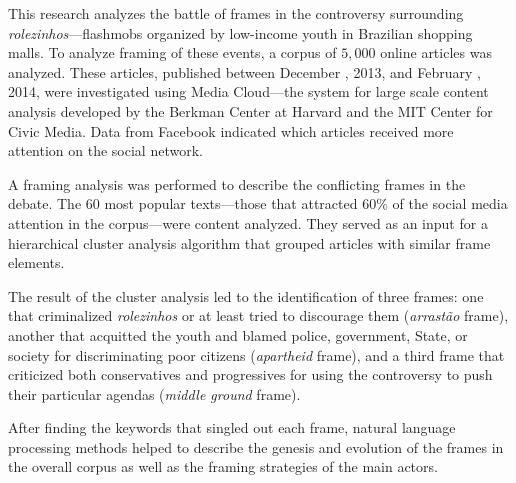 This research analyzes the battle of frames in the controversy surrounding \emph{rolezinhos}---flashmobs organized by low-income youth in Brazilian shopping malls. To analyze framing of these events, a corpus of $5,000$ online articles was analyzed. These articles, published between December , 2013, and February , 2014, were investigated using Media Cloud---the system for large scale content analysis developed by the Berkman Center at Harvard and the MIT Center for Civic Media. Data from Facebook indicated which articles received more attention on the social network.

A framing analysis was performed to describe the conflicting frames in the debate. The 60 most popular texts---those that attracted $60\%$ of the social media attention in the corpus---were content analyzed. They served as an input for a hierarchical cluster analysis algorithm that grouped articles with similar frame elements.

The result of the cluster analysis led to the identification of three frames: one that criminalized \emph{rolezinhos} or at least tried to discourage them (\emph{arrastão} frame), another that acquitted the youth and blamed police, government, State, or society for discriminating poor citizens (\emph{apartheid} frame), and a third frame that criticized both conservatives and progressives for using the controversy to push their particular agendas (\emph{middle ground} frame).

After finding the keywords that singled out each frame, natural language processing methods helped to describe the genesis and evolution of the frames in the overall corpus as well as the framing strategies of the main actors.